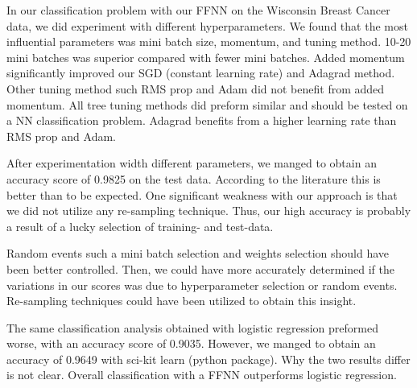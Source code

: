
In our classification problem with our FFNN on the Wisconsin Breast Cancer
data, we did experiment with different hyperparameters. We found that the most
influential parameters was mini batch size, momentum, and tuning method.  
10-20 mini batches was superior compared with fewer mini batches. Added
momentum significantly improved our SGD (constant learning rate) and
Adagrad method. Other tuning method such RMS prop and Adam did not benefit from
added momentum. All tree tuning methods did preform similar and should be tested on a NN classification
problem. Adagrad benefits from a higher learning rate than RMS prop and Adam.    

After experimentation width different parameters, we manged to obtain an
accuracy score of 0.9825 on the test data. According to the literature this is
better than to be expected. One significant weakness with our approach is that
we did not utilize any re-sampling technique. Thus, our high accuracy is probably a
result of a lucky selection of training- and test-data. 

Random events such a mini batch selection and weights selection should have
been better controlled. Then, we could have more accurately determined if the
variations in our scores was due to hyperparameter selection or random events.
Re-sampling techniques could have been utilized to obtain this insight. 

The same classification analysis obtained with logistic regression preformed
worse, with an accuracy score of 0.9035. However, we manged to obtain an accuracy
of 0.9649 with sci-kit learn (python package). Why the two results differ is
not clear. Overall classification with a FFNN outperforms logistic regression. 






